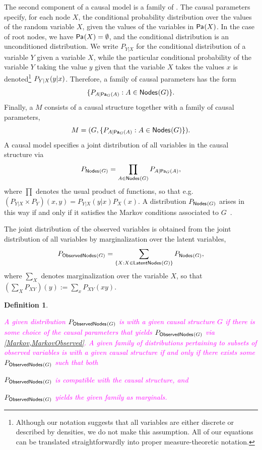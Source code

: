 \documentclass[aps,english,10pt,superscriptaddress,onecolumn,twoside,longbibliography,pra,floatfix,fleqn,nofootinbib]{revtex4-1}
\newcommand*{\tblue}[1]{{\color{MidnightBlue}{\textbf{#1}}}}
\newtheorem{definition}[theorem]{Definition}
\theoremstyle{definition}
\newcommand{\p}[2][]{{P_{#1}}\parenths{#2}}
\newcommand{\pfunc}[1]{P_{#1}}
\newcommand{\Pa}[2][]{{\mathsf{Pa}_{#1}}\parenths{#2}}
\newcommand{\SmallNamedFunction}[3][]{\operatorname{\mathsf{#2}}_{#1}\parenths{#3}}
\newcommand{\nodes}[1]{\SmallNamedFunction{Nodes}{#1}}
\newcommand{\obsnodes}[1]{\SmallNamedFunction{ObservedNodes}{#1}}
\newcommand{\latnodes}[1]{\SmallNamedFunction{LatentNodes}{#1}}
\DeclarePairedDelimiter{\parenths}{\lparen}{\rparen}
\newcommand{\elie}[1]{\textcolor{Fuchsia}{#1}}
\begin{document}
The second component of a causal model is a family of \tblue{causal parameters}.
The causal parameters specify, for each node $X$, the conditional probability distribution over the values of the random variable $X$, given the values of the variables in $\Pa{X}$.  In the case of root nodes, we have $\Pa{X} = \emptyset$, and the conditional distribution is an unconditioned distribution.
We write $\pfunc{Y|X}$ for the conditional distribution of a variable $Y$ given a variable $X$, while the particular conditional probability of the variable $Y$ taking the value $y$ given that the variable $X$ takes the values $x$ is denoted\footnote{Although our notation suggests that all variables are either discrete or described by densities, we do not make this assumption.  All of our equations can be translated straightforwardly into proper measure-theoretic notation.} $\p[Y|X]{y|x}$.    Therefore, a family of causal parameters has the form
\begin{align}
 \{ \pfunc{A|\Pa[G]{A}} : A \in \nodes{G} \}.
\end{align}
Finally, a \tblue{causal model} $M$ consists of a causal structure together with a family of causal parameters,
\[
	M = ( G,   \{ \pfunc{A|\Pa[G]{A}} : A \in \nodes{G} \}).
\]
A causal model specifies a joint distribution of all variables in the causal structure via
\begin{align}\label{Markov}
P_{\nodes{G}} = \prod_{A\in \nodes{G}} \pfunc{A|\Pa[G]{A}},
\end{align}
where $\prod$ denotes the usual product of functions, so that e.g.~$(P_{Y|X} \times P_Y)(x,y) = P_{Y|X}(y|x) P_X(x)$. A distribution $P_{\nodes{G}}$ arises in this way if and only if it satisfies the Markov conditions associated to $G$~\cite[Sec.~1.2]{pearl2009causality}.

The joint distribution of the observed variables is obtained from the joint distribution of all variables by marginalization over the latent variables,
\begin{align}\label{MarkovObserved}
P_{\obsnodes{G}} =  \sum_{\{X :X \in\latnodes{G}\}} P_{\nodes{G}},
\end{align}
where $\sum_X$ denotes marginalization over the variable $X$, so that $(\sum_X P_{XY})(y):= \sum_x P_{XY}(xy)$.

\begin{definition}\elie{
A given distribution $P_{\obsnodes{G}}$ is \tblue{compatible} with a given causal structure $G$ if there is some choice of the causal parameters that yields $P_{\obsnodes{G}}$ via \cref{Markov,MarkovObserved}. 
A given \emph{family} of distributions pertaining to \emph{subsets} of observed variables is \tblue{compatible} with a given causal structure if and only if there exists some $P_{\obsnodes{G}}$  such that both \begin{compactenum}
\item $P_{\obsnodes{G}}$ is compatible with the causal structure, and 
\item $P_{\obsnodes{G}}$  yields the given family as marginals.
\end{compactenum}}
\end{definition}
\end{document}

